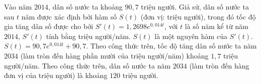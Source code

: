 \begin{ex}
Vào năm $2014$, dân số nước ta khoảng $90{,}7$ triệu người. Giả sử, dân số nước ta sau $t$ năm được xác định bởi hàm số $S(t)$ (đơn vị: triệu người), trong đó tốc độ gia tăng dân số được cho bởi $S'(t)=1{,}2698e^{0{,}014t}$, với $t$ là số năm kể từ năm $2014$, $S'(t)$ tính bằng triệu người/năm.
\choiceTF
{\True $S(t)$ là một nguyên hàm của $S'(t)$.}
{$S(t)=90{,}7e^{0{,}014t}+90{,}7$.}
{\True Theo công thức trên, tốc độ tăng dân số nước ta năm $2034$ (làm tròn đến hàng phần mười của triệu người/năm) khoảng $1{,}7$ triệu người/năm.}
{\True Theo công thức trên, dân số nước ta năm $2034$ (làm tròn đến hàng đơn vị của triệu người) là khoảng $120$ triệu người.}
\end{ex}
